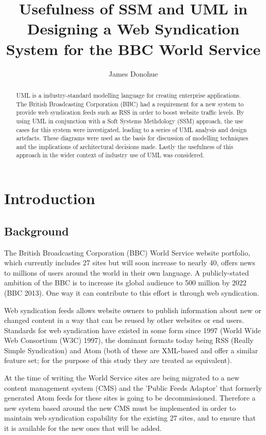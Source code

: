 \documentclass{article}
\begin{document}
\title{Usefulness of SSM and UML in Designing a Web Syndication System for the BBC World Service}
\author{James Donohue}

\maketitle

\begin{abstract}
UML\cite{omg2011} is a industry-standard modelling language for creating enterprise applications. The British Broadcasting Corporation (BBC) had a requirement for a new system to provide web syndication feeds such as RSS in order to boost website traffic levels. By using UML in conjunction with a Soft Systems Methdology (SSM) approach, the use cases for this system were investigated, leading to a series of UML analysis and design artefacts. These diagrams were used as the basis for discussion of modelling techniques and the implications of architectural decisions made. Lastly the usefulness of this approach in the wider context of industry use of UML was considered.
\end{abstract}

\section{Introduction}
\subsection{Background}

The British Broadcasting Corporation (BBC) World Service website portfolio, which currently includes 27 sites but will soon increase to nearly 40, offers news to millions of users around the world in their own language. A publicly-stated ambition of the BBC is to increase its global audience to 500 million by 2022 (BBC 2013). One way it can contribute to this effort is through web syndication.

Web syndication feeds allows website owners to publish information about new or changed content in a way that can be reused by other websites or end users. Standards for web syndication have existed in some form since 1997 (World Wide Web Consortium (W3C) 1997), the dominant formats today being RSS (Really Simple Syndication) and Atom (both of these are XML-based and offer a similar feature set; for the purpose of this study they are treated as equivalent).

At the time of writing the World Service sites are being migrated to a new content management system (CMS) and the 'Public Feeds Adaptor' that formerly generated Atom feeds for these sites is going to be decommissioned. Therefore a new system based around the new CMS must be implemented in order to maintain web syndication capability for the existing 27 sites, and to ensure that it is available for the new ones that will be added.
\end{document}

